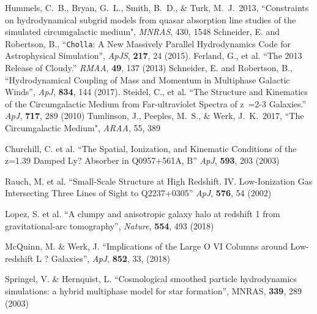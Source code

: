 \documentclass[11pt,letterpaper,english]{article}
\begin{document}
{\begin{thebibliography}{500}
 Hummels, C.~B., Bryan, G.~L., Smith, B.~D., \& Turk, M.~J.\ 2013,  ``Constraints on hydrodynamical subgrid models from quasar absorption line studies of the simulated circumgalactic medium", {\em MNRAS}, 430, 1548 
 Schneider, E. and Robertson, B., ``{\tt Cholla}: A New Massively Parallel Hydrodynamics Code for Astrophysical Simulation'', {\em ApJS}, {\bf 217}, 24 (2015).
\vspace{-.09in}
 Ferland, G., et al. ``The 2013 Release of Cloudy.'' {\em RMAA}, {\bf 49}, 137 (2013)
\vspace{-.09in}
 Schneider, E. and Robertson, B., ``Hydrodynamical Coupling of Mass and Momentum in Multiphase Galactic Winds'', {\em ApJ}, {\bf 834}, 144 (2017).
\vspace{-.09in}
 Steidel, C., et al. ``The Structure and Kinematics of the Circumgalactic Medium from Far-ultraviolet Spectra of z~=2-3 Galaxies.'' {\em ApJ}, {\bf 717}, 289 (2010)
 Tumlinson, J., Peeples, M.~S., \& Werk, J.~K.\ 2017,  ``The Circumgalactic Medium", {\em ARAA}, 55, 389 

 Churchill, C. et al. ``The Spatial, Ionization, and Kinematic Conditions of the z=1.39 Damped Ly? Absorber in Q0957+561A, B'' {\em ApJ}, {\bf 593}, 203 (2003) 

 Rauch, M. et al.  ``Small-Scale Structure at High Redshift. IV. Low-Ionization Gas Intersecting Three Lines of Sight to Q2237+0305'' {\em ApJ}, {\bf 576}, 54 (2002)

 Lopez, S. et al. ``A clumpy and anisotropic galaxy halo at redshift 1 from gravitational-arc tomography'', {\em Nature}, {\bf 554}, 493 (2018)

 McQuinn, M. \& Werk, J. ``Implications of the Large O VI Columns around Low-redshift L ? Galaxies'', {\em ApJ}, {\bf 852}, 33, (2018)


 Springel, V. \& Hernquist, L. ``Cosmological smoothed particle hydrodynamics simulations: a hybrid multiphase model for star formation'', {\rm MNRAS}, {\bf 339}, 289 (2003)
\vspace{-.09in}
\end{thebibliography}
}
\end{document}
